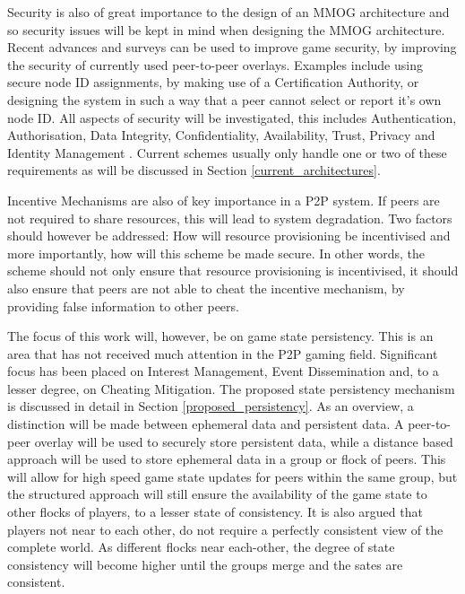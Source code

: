 \documentclass[journal,oneside,a4paper,onecolumn]{IEEEtran}
\begin{document}
Security is also of great importance to the design of an MMOG architecture and so security issues will be kept in mind when designing the MMOG architecture. Recent advances and surveys can be used to improve game security, by improving the security of currently used peer-to-peer overlays. Examples include using secure node ID assignments, by making use of a Certification Authority, or designing the system in such a way that a peer cannot select or report it's own node ID. All aspects of security will be investigated, this includes Authentication, Authorisation, Data Integrity, Confidentiality, Availability, Trust, Privacy and Identity Management \cite{distributed_systems_security}. Current schemes usually only handle one or two of these requirements as will be discussed in Section \ref{current_architectures}.

Incentive Mechanisms are also of key importance in a P2P system. If peers are not required to share resources, this will lead to system degradation. Two factors should however be addressed: How will resource provisioning be incentivised and more importantly, how will this scheme be made secure. In other words, the scheme should not only ensure that resource provisioning is incentivised, it should also ensure that peers are not able to cheat the incentive mechanism, by providing false information to other peers.

The focus of this work will, however, be on game state persistency. This is an area that has not received much attention in the P2P gaming field. Significant focus has been placed on Interest Management, Event Dissemination and, to a lesser degree, on Cheating Mitigation. The proposed state persistency mechanism is discussed in detail in Section \ref{proposed_persistency}. As an overview, a distinction will be made between ephemeral data and persistent data. A peer-to-peer overlay will be used to securely store persistent data, while a distance based approach will be used to store ephemeral data in a group or flock of peers. This will allow for high speed game state updates for peers within the same group, but the structured approach will still ensure the availability of the game state to other flocks of players, to a lesser state of consistency. It is also argued that players not near to each other, do not require a perfectly consistent view of the complete world. As different flocks near each-other, the degree of state consistency will become higher until the groups merge and the sates are consistent.
\end{document}
